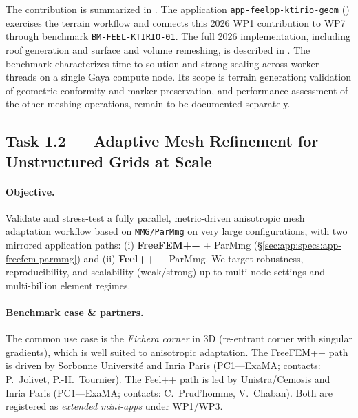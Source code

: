The contribution is summarized in .
The application \texttt{app-feelpp-ktirio-geom}
() exercises the terrain workflow and
connects this 2026 WP1 contribution to WP7 through benchmark
\texttt{BM-FEEL-KTIRIO-01}. The full 2026 implementation, including roof
generation and surface and volume remeshing, is described in
.
The benchmark characterizes time-to-solution and
strong scaling across worker threads on a single Gaya compute node.
Its scope is terrain generation; validation of geometric conformity and marker
preservation, and performance assessment of the other meshing operations,
remain to be documented separately.



\subsection{Task 1.2 — Adaptive Mesh Refinement for Unstructured Grids at Scale}
\label{sec:wp1:t1.2}

\paragraph{Objective.}
Validate and stress-test a fully parallel, metric-driven anisotropic mesh adaptation workflow based on \texttt{MMG/ParMmg} on very large configurations, with two mirrored application paths:
(i) \textbf{FreeFEM++} + ParMmg (\S\ref{sec:app:specs:app-freefem-parmmg}) and
(ii) \textbf{Feel++} + ParMmg.
We target robustness, reproducibility, and scalability (weak/strong) up to multi-node settings and multi-billion element regimes.

\paragraph{Benchmark case \& partners.}
The common use case is the \emph{Fichera corner} in 3D (re-entrant corner with singular gradients), which is well suited to anisotropic adaptation.
The FreeFEM++ path is driven by Sorbonne Université and Inria Paris (PC1—ExaMA; contacts: P.~Jolivet, P.-H.~Tournier).
The Feel++ path is led by Unistra/Cemosis and Inria Paris (PC1—ExaMA; contacts: C.~Prud’homme, V.~Chaban).
Both are registered as \emph{extended mini-apps} under WP1/WP3.

